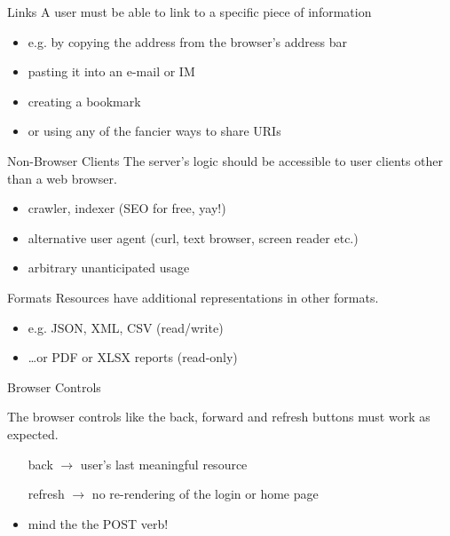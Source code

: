 \documentclass{beamer}
\begin{document}
\begin{frame}
  \vspace*{-1cm}
  \textcolor{gray}{
    \begin{center}
      \textbf{
        \fontsize{60}{50}\selectfont \insertsectionhead
      }
    \end{center}
  }
\end{frame}

\begin{frame}{Links}
  A user must be able to link to a specific piece of information

  \begin{itemize}
    \item e.g. by copying the address from the browser's address bar
    \item pasting it into an e-mail or IM
    \item creating a bookmark
    \item or using any of the fancier ways to share URIs
  \end{itemize}
\end{frame}

\begin{frame}{Non-Browser Clients}
  The server's logic should be accessible to user clients other than a web browser.

  \begin{itemize}
    \item crawler, indexer (SEO for free, yay!)
    \item alternative user agent (curl, text browser, screen reader etc.)
    \item arbitrary unanticipated usage
  \end{itemize}
\end{frame}

\begin{frame}{Formats}
  Resources have additional representations in other formats.

  \begin{itemize}
    \item e.g. JSON, XML, CSV (read/write)
    \item \dots or PDF or XLSX reports (read-only)
  \end{itemize}
\end{frame}

\begin{frame}{Browser Controls}

  The browser controls like the back, forward and refresh buttons must work as expected.

  \begin{itemize}
    \item[back] \ensuremath{\rightarrow} user's last meaningful resource
    \item[refresh] \ensuremath{\rightarrow} no re-rendering of the login or home page
    \item mind the the POST verb!
  \end{itemize}
\end{frame}
\end{document}
